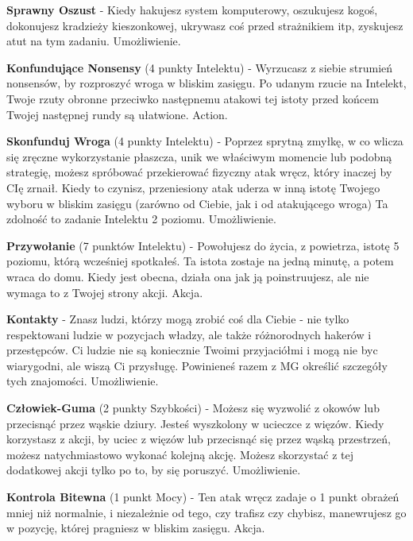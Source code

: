 {\textbf{Sprawny Oszust}\label{sec:Sprawny Oszust} - Kiedy hakujesz system komputerowy, oszukujesz kogoś, dokonujesz kradzieży kieszonkowej, ukrywasz coś przed strażnikiem itp, zyskujesz atut na tym zadaniu. Umożliwienie.

\textbf{Konfundujące Nonsensy}\label{sec:Konfundujące Nonsensy} (4 punkty Intelektu) - Wyrzucasz z siebie strumień nonsensów, by rozproszyć wroga w bliskim zasięgu. Po udanym rzucie na Intelekt, Twoje rzuty obronne przeciwko następnemu atakowi tej istoty przed końcem Twojej następnej rundy są ułatwione. Action.

\textbf{Skonfunduj Wroga}\label{sec:Skonfunduj Wroga} (4 punkty Intelektu) - Poprzez sprytną zmyłkę, w co wlicza się zręczne wykorzystanie płaszcza, unik we właściwym momencie lub podobną strategię, możesz spróbować przekierować fizyczny atak wręcz, który inaczej by CIę zrnaił. Kiedy to czynisz, przeniesiony atak uderza w inną istotę Twojego wyboru w bliskim zasięgu (zarówno od Ciebie, jak i od atakującego wroga) Ta zdolność to zadanie Intelektu 2 poziomu. Umożliwienie. 

\textbf{Przywołanie}\label{sec:Przywołanie} (7 punktów Intelektu) - Powołujesz do życia, z powietrza, istotę 5 poziomu, którą wcześniej spotkałeś. Ta istota zostaje na jedną minutę, a potem wraca do domu. Kiedy jest obecna, działa ona jak ją poinstruujesz, ale nie wymaga to z Twojej strony akcji. Akcja.

\textbf{Kontakty}\label{sec:Kontakty}  - Znasz ludzi, którzy mogą zrobić coś dla Ciebie - nie tylko respektowani ludzie w pozycjach władzy, ale także różnorodnych hakerów i przestępców. Ci ludzie nie są koniecznie Twoimi przyjaciółmi i mogą nie byc wiarygodni, ale wiszą Ci przysługę. Powinieneś razem z MG określić szczegóły tych znajomości. Umożliwienie. 

\textbf{Człowiek-Guma}\label{sec:Człowiek-Guma} (2 punkty Szybkości) - Możesz się wyzwolić z okowów lub przecisnąć przez wąskie dziury. Jesteś wyszkolony w ucieczce z więzów. Kiedy korzystasz z akcji, by uciec z więzów lub przecisnąć się przez wąską przestrzeń, możesz natychmiastowo wykonać kolejną akcję. Możesz skorzystać z tej dodatkowej akcji tylko po to, by się poruszyć. Umożliwienie. 

\textbf{Kontrola Bitewna}\label{sec:Kontrola Bitewna} (1 punkt Mocy) - Ten atak wręcz zadaje o 1 punkt obrażeń mniej niż normalnie, i niezależnie od tego, czy trafisz czy chybisz, manewrujesz go w pozycję, której pragniesz w bliskim zasięgu. Akcja.

}
